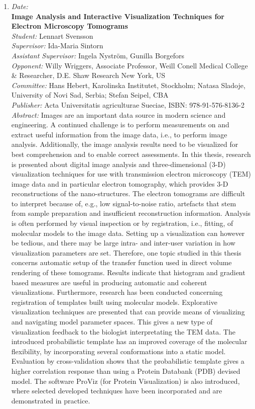 {\begin{enumerate}
\item
{\em Date:} ~\\
{\bf Image Analysis and Interactive Visualization Techniques for Electron Microscopy Tomograms}~\\
{\em Student:} Lennart Svensson~\\
{\em Supervisor:} Ida-Maria Sintorn~\\
{\em Assistant Supervisor:} Ingela Nystr\"{o}m, Gunilla Borgefors~\\
{\em Opponent:} Willy Wriggers, Associate Professor, Weill Conell Medical College \& Researcher, D.E. Shaw Research New York, US~\\
{\em Committee:} 
Hans Hebert, Karolinska Institutet, Stockholm; 
Natasa Sladoje, 
University of Novi Sad, Serbia; 
Stefan Seipel, CBA
\\
{\em Publisher:} Acta Universitatis agriculturae Sueciae, ISBN: 978-91-576-8136-2 ~\\ 
{\em Abstract:} Images are an important data source in modern science and engineering. A continued challenge is to perform measurements on and extract useful information from the image data, i.e., to perform image analysis. Additionally, the image analysis results need to be visualized for best comprehension and to enable correct assessments. In this thesis, research is presented about digital image analysis and three-dimensional (3-D) visualization techniques for use with transmission electron microscopy (TEM) image data and in particular electron tomography, which provides 3-D reconstructions of the nano-structures. The electron tomograms are difficult to interpret because of, e.g., low signal-to-noise ratio, artefacts that stem from sample preparation and insufficient reconstruction information. Analysis is often performed by visual inspection or by registration, i.e., fitting, of molecular models to the image data. Setting up a visualization can however be tedious, and there may be large intra- and inter-user variation in how visualization parameters are set. Therefore, one topic studied in this thesis concerns automatic setup of the transfer function used in direct volume rendering of these tomograms. Results indicate that histogram and gradient based measures are useful in producing automatic and coherent visualizations. Furthermore, research has been conducted concerning registration of templates built using molecular models. Explorative visualization techniques are presented that can provide means of visualizing and navigating model parameter spaces. This gives a new type of visualization feedback to the biologist interpretating the TEM data. The introduced probabilistic template has an improved coverage of the molecular flexibility, by incorporating several conformations into a static model. Evaluation by cross-validation shows that the probabilistic template gives a higher correlation response than using a Protein Databank (PDB) devised model. The software ProViz (for Protein Visualization) is also introduced, where selected developed techniques have been incorporated and are demonstrated in practice.


\end{enumerate}}
